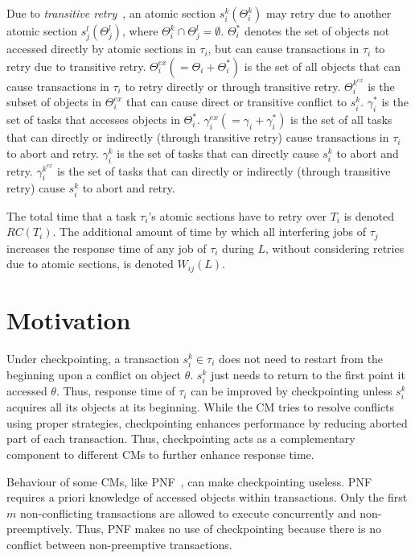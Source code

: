 \documentclass[conference]{IEEEtran}
\begin{document}
Due to \textit{transitive retry}~\cite{pnf_dac_asp,fblt}, an atomic section $s_i^k(\Theta_i^k)$ may retry due to another atomic section $s_j^l(\Theta_j^l)$, where $\Theta_i^k \cap \Theta_j^l = \emptyset$. $\Theta_i^*$ denotes the set of objects not accessed directly by atomic sections in $\tau_i$, but can cause transactions in $\tau_i$ to retry due to transitive retry. $\Theta_i^{ex}(=\Theta_i + \Theta_i^*)$ is the set of all objects that can cause transactions in $\tau_i$ to retry directly or through transitive retry. $\Theta_i^{k^{ex}}$ is the subset of objects in $\Theta_i^{ex}$ that can cause direct or transitive conflict to $s_i^k$. $\gamma_i^*$ is the set of tasks that accesses  objects in $\Theta_i^*$. $\gamma_i^{ex}(=\gamma_i + \gamma_i^*)$ is the set of all tasks that can directly or indirectly (through transitive retry) cause transactions in $\tau_i$ to abort and retry. $\gamma_i^k$ is the set of tasks that can directly cause $s_i^k$ to abort and retry. $\gamma_i^{k^{ex}}$ is the set of tasks that can directly or indirectly (through transitive retry) cause $s_i^k$ to abort and retry.

The total time that a task $\tau_i$'s atomic sections have to retry over $T_i$ is denoted $RC(T_i)$. The additional amount of time by which all interfering jobs of $\tau_j$ increases the response time of any job of $\tau_i$ during $L$, without considering retries due to atomic sections, is denoted $W_{ij}(L)$.

\section{Motivation}\label{sec:motivation}

Under checkpointing, a transaction $s_i^k \in \tau_i$ does not need to restart from the beginning upon a conflict on object $\theta$. $s_i^k$ just needs to return to the first point it accessed $\theta$. Thus, response time of $\tau_i$ can be improved by checkpointing unless $s_i^k$ acquires all its objects at its beginning. While the CM tries to resolve conflicts using proper strategies, checkpointing enhances performance by reducing aborted part of each transaction. Thus, checkpointing acts as a complementary component to different CMs to further enhance response time.

Behaviour of some CMs, like PNF~\cite{pnf_dac_asp}, can make checkpointing useless. PNF requires a priori knowledge of accessed objects within transactions. Only the first $m$ non-conflicting transactions are allowed to execute concurrently and non-preemptively. Thus, PNF makes no use of checkpointing because there is no conflict between non-preemptive transactions.
\end{document}
